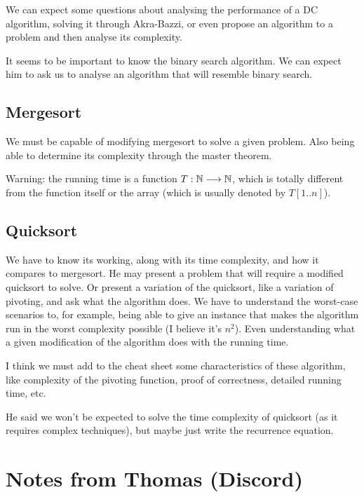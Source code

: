 We can expect some questions about analysing the performance of a DC algorithm, solving it through Akra-Bazzi, or even propose an algorithm to a problem and then analyse its complexity.

It seems to be important to know the binary search algorithm.
We can expect him to ask us to analyse an algorithm that will resemble binary search.

\subsection*{Mergesort}

We must be capable of modifying mergesort to solve a given problem.
Also being able to determine its complexity through the master theorem.

Warning: the running time is a function $T: \mathbb{N} \longrightarrow \mathbb{N}$, which is totally different from the function itself or the array (which is usually denoted by $T[1..n]$).

\subsection*{Quicksort}

We have to know its working, along with its time complexity, and how it compares to mergesort.
He may present a problem that will require a modified quicksort to solve.
Or present a variation of the quicksort, like a variation of pivoting, and ask what the algorithm does.
We have to understand the worst-case scenarios to, for example, being able to give an instance that makes the algorithm run in the worst complexity possible (I believe it's $n^2$).
Even understanding what a given modification of the algorithm does with the running time.

\begin{note}
    I think we must add to the cheat sheet some characteristics of these algorithm, like complexity of the pivoting function, proof of correctness, detailed running time, etc.
\end{note}

He said we won't be expected to solve the time complexity of quicksort (as it requires complex techniques), but maybe just write the recurrence equation.

\newpage
\section*{Notes from Thomas (Discord)}

